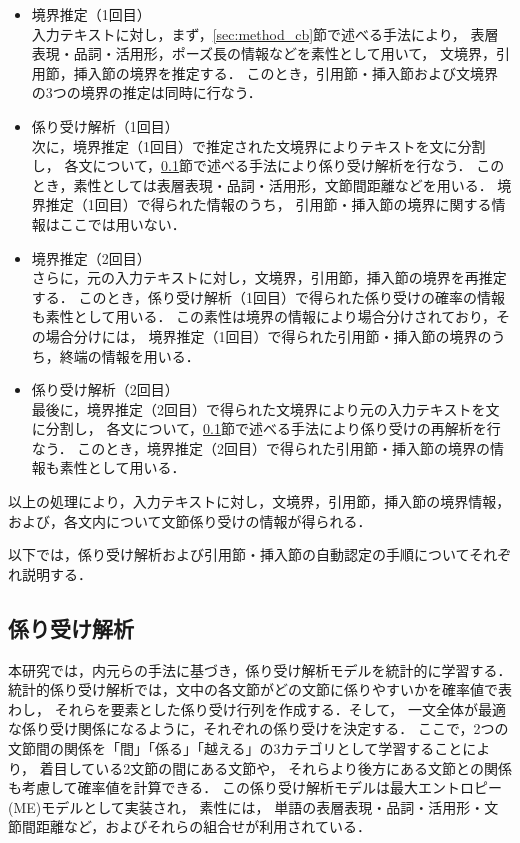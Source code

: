 \documentclass[japanese]{jnlp_1.4}
\begin{document}
\begin{itemize}
\item
境界推定（1回目）\\
入力テキストに対し，まず，\ref{sec:method_cb}節で述べる手法により，
表層表現・品詞・活用形，ポーズ長の情報などを素性として用いて，
文境界，引用節，挿入節の境界を推定する．
このとき，引用節・挿入節および文境界の3つの境界の推定は同時に行なう．

\item 係り受け解析（1回目）\\
次に，境界推定（1回目）で推定された文境界によりテキストを文に分割し，
各文について，\ref{sec:method_ds}節で述べる手法により係り受け解析を行なう．
このとき，素性としては表層表現・品詞・活用形，文節間距離などを用いる．
境界推定（1回目）で得られた情報のうち，
引用節・挿入節の境界に関する情報はここでは用いない．

\item 境界推定（2回目）\\
さらに，元の入力テキストに対し，文境界，引用節，挿入節の境界を再推定する．
このとき，係り受け解析（1回目）で得られた係り受けの確率の情報も素性として用いる．
この素性は境界の情報により場合分けされており，その場合分けには，
境界推定（1回目）で得られた引用節・挿入節の境界のうち，終端の情報を用いる．

\item 係り受け解析（2回目）\\
最後に，境界推定（2回目）で得られた文境界により元の入力テキストを文に分割し，
各文について，\ref{sec:method_ds}節で述べる手法により係り受けの再解析を行なう．
このとき，境界推定（2回目）で得られた引用節・挿入節の境界の情報も素性として用いる．

\end{itemize}

以上の処理により，入力テキストに対し，文境界，引用節，挿入節の境界情報，
および，各文内について文節係り受けの情報が得られる．

以下では，係り受け解析および引用節・挿入節の自動認定の手順についてそれぞれ説明する．


\subsection{係り受け解析}\label{sec:method_ds}

本研究では，内元らの手法\cite{uchimoto_2000}に基づき，係り受け解析モデルを統計的に学習する．
統計的係り受け解析では，文中の各文節がどの文節に係りやすいかを確率値で表わし，
それらを要素とした係り受け行列を作成する．そして，
一文全体が最適な係り受け関係になるように，それぞれの係り受けを決定する．
ここで，2つの文節間の関係を「間」「係る」「越える」の3カテゴリとして学習することにより，
着目している2文節の間にある文節や，
それらより後方にある文節との関係も考慮して確率値を計算できる．
この係り受け解析モデルは最大エントロピー(ME)モデルとして実装され，
素性には，
単語の表層表現・品詞・活用形・文節間距離など，およびそれらの組合せが利用されている．
\end{document}
